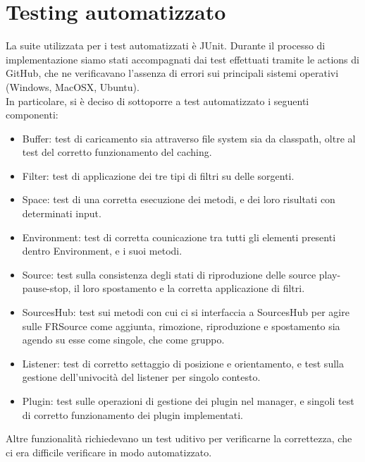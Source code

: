 \documentclass[a4paper,12pt]{report}
\begin{document}
\section{Testing automatizzato}
La suite utilizzata per i test automatizzati è JUnit. Durante il processo di implementazione siamo stati accompagnati dai test effettuati tramite le actions di GitHub, che ne verificavano l'assenza di errori sui principali sistemi operativi (Windows, MacOSX, Ubuntu).
\\In particolare, si è deciso di sottoporre a test automatizzato i seguenti componenti:
\begin{itemize}
	\item Buffer: test di caricamento sia attraverso file system sia da classpath, oltre al test del corretto funzionamento del caching.
	\item Filter: test di applicazione dei tre tipi di filtri su delle sorgenti.
	\item Space: test di una corretta esecuzione dei metodi, e dei loro risultati con determinati input.
	\item Environment: test di corretta counicazione tra tutti gli elementi presenti dentro Environment, e i suoi metodi.
	\item Source: test sulla consistenza degli stati di riproduzione delle source play-pause-stop, il loro spostamento e la corretta applicazione di filtri.
	\item SourcesHub: test sui metodi con cui ci si interfaccia a SourcesHub per agire sulle FRSource come aggiunta, rimozione, riproduzione e spostamento sia agendo su esse come singole, che come gruppo.
	\item Listener: test di corretto settaggio di posizione e orientamento, e test sulla gestione dell'univocità del listener per singolo contesto.
	\item Plugin: test sulle operazioni di gestione dei plugin nel manager, e singoli test di corretto funzionamento dei plugin implementati.
\end{itemize}
Altre funzionalità richiedevano un test uditivo per verificarne la correttezza, che ci era difficile verificare in modo automatizzato.
%
\end{document}
